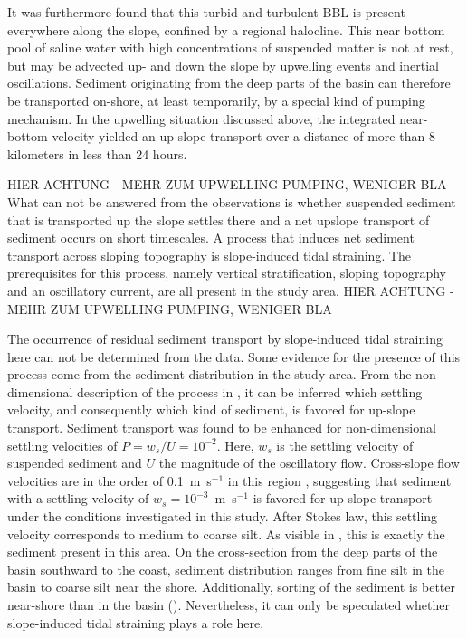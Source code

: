 It was furthermore found that this turbid and turbulent BBL is present 
everywhere 
along the slope, confined by a regional halocline. This near bottom pool of 
saline water with high concentrations of suspended matter is not at rest, but 
may be advected up- and down the slope by upwelling events and inertial 
oscillations. 
Sediment originating from the deep parts of the basin can therefore be 
transported on-shore, at least temporarily, by a special kind of pumping 
mechanism. In the upwelling situation 
discussed above, the integrated near-bottom velocity yielded an up slope 
transport over a distance of more than 8 kilometers in less than 24 hours. 

HIER ACHTUNG - MEHR ZUM UPWELLING PUMPING, WENIGER BLA
What can not be answered from the observations is whether suspended sediment 
that is transported up the slope settles there and a net upslope transport of 
sediment occurs on short timescales. A process that induces net sediment 
transport across sloping 
topography is slope-induced tidal straining. The prerequisites for this 
process, namely vertical stratification, sloping topography and an oscillatory 
current, are all present in the study area. 
HIER ACHTUNG - MEHR ZUM UPWELLING PUMPING, WENIGER BLA

The occurrence of residual sediment transport by slope-induced tidal straining 
here can not be determined from the data. Some evidence for the presence of 
this process come from the sediment distribution in the study area. From the 
non-dimensional description of the process in \cite{schulzumlauf2016}, 
it can be inferred which settling velocity, and consequently which kind of 
sediment, is favored for up-slope transport. Sediment transport was found 
to be enhanced for non-dimensional settling velocities of $P= w_s \slash U = 
10^{-2}$. Here, $w_s$ is the settling velocity of suspended sediment and $U$ 
the magnitude of the oscillatory flow. Cross-slope flow velocities are in the 
order of 0.1~m~s$^{-1}$ in this region \citep[][data from this 
study]{lass1993}, suggesting that sediment with a settling velocity of 
$w_s=10^{-3}$~m~s$^{-1}$ is favored for up-slope transport under the conditions 
investigated in this study. After Stokes law, this settling velocity 
corresponds to medium to coarse silt. As visible in , this is 
exactly the sediment present in this area. On the cross-section from the deep 
parts of the basin southward to the coast, sediment distribution ranges from 
fine silt in the basin to coarse silt near the shore. Additionally, sorting of 
the sediment is better near-shore than in the basin (). 
Nevertheless, it can only be speculated whether slope-induced tidal straining 
plays a role here.


